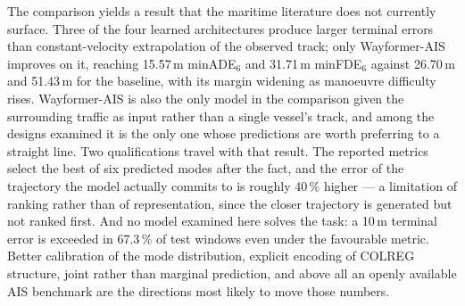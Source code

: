 \documentclass[12pt, a4paper]{article}
\begin{document}
  The comparison yields a result that the maritime literature does not currently
  surface.  Three of the four learned architectures produce larger terminal
  errors than constant-velocity extrapolation of the observed track; only
  Wayformer-AIS improves on it, reaching 15.57\,m minADE$_6$ and 31.71\,m
  minFDE$_6$ against 26.70\,m and 51.43\,m for the baseline, with its margin
  widening as manoeuvre difficulty rises.  Wayformer-AIS is also the only model
  in the comparison given the surrounding traffic as input rather than a single
  vessel's track, and among the designs examined it is the only one whose
  predictions are worth preferring to a straight line.  Two qualifications
  travel with that result.  The reported metrics select the best of six predicted
  modes after the fact, and the error of the trajectory the model actually
  commits to is roughly 40\,\% higher --- a limitation of ranking rather than of
  representation, since the closer trajectory is generated but not ranked first.
  And no model examined here solves the task: a 10\,m terminal error is exceeded
  in 67.3\,\% of test windows even under the favourable metric.  Better
  calibration of the mode distribution, explicit encoding of COLREG structure,
  joint rather than marginal prediction, and above all an openly available AIS
  benchmark are the directions most likely to move those numbers.

  
  

  
\end{document}
